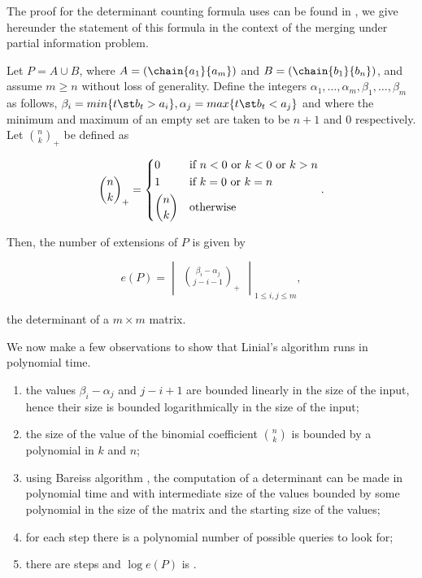 The proof for the determinant counting formula \citet*{linial:1984} uses can be
found in \citet*{mohanty:1979}, we give hereunder the statement of this formula
in the context of the merging under partial information problem.

\begin{theorem}
Let \(P = A \cup B\), where \(A = (\chain{a_1}{a_m})\) and \(B =
(\chain{b_1}{b_n})\), and assume \(m \ge n\) without loss of generality. Define
the integers \(\alpha_1,\ldots,\alpha_m,\beta_1,\ldots,\beta_m\) as follows,
\(\beta_i = min\{t \st b_t > a_i\}, \alpha_j = max\{t \st b_t < a_j\}\) and
where the minimum and maximum of an empty set are taken to be \(n + 1\) and
\(0\) respectively. Let \(\binom{n}{k}_{+}\) be defined as

\begin{displaymath}
\binom{n}{k}_{+} =
\begin{dcases*}
0            & if  \(n < 0\)  or \(k < 0\)  or \(k > n\)\\
1            & if \(k = 0\)  or \(k = n\)\\
\binom{n}{k} & otherwise\\
\end{dcases*}.
\end{displaymath}

Then, the number of extensions of \(P\) is given by

\begin{displaymath}
e(P) =
\begin{vmatrix}
\binom{\beta_i - \alpha_j}{j - i - 1}_{+}
\end{vmatrix}_{1 \le i , j \le m},
\end{displaymath}

the determinant of a \(m \times m\) matrix.
\end{theorem}

We now make a few observations to show that Linial's algorithm runs in
polynomial time.

\begin{enumerate}
\item the values \(\beta_i - \alpha_j\) and \(j - i + 1\) are bounded
linearly in the size of the input, hence their size is bounded
logarithmically in the size of the input;
\item the size of the value of the binomial coefficient \(\binom{n}{k}\) is
bounded by a polynomial in \(k\) and \(n\);
\item using Bareiss algorithm \cite{bareiss:1968}, the computation of a
determinant can be made in polynomial time and with intermediate size of the
values bounded by some polynomial in the size of the matrix and the starting
size of the values;
\item for each step there is a polynomial number of possible queries to look for;
\item there are  steps and \(\log e(P)\) is .
\end{enumerate}

